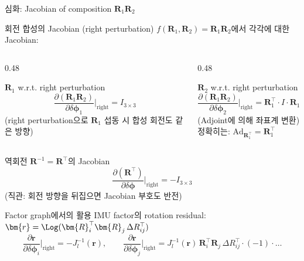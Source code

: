 \begin{frame}[shrink=5]{심화: Jacobian of composition $\bm{R}_1\bm{R}_2$}
  \begin{block}{회전 합성의 Jacobian (right perturbation)}
    $f(\bm{R}_1, \bm{R}_2) = \bm{R}_1\bm{R}_2$에서 각각에 대한 Jacobian:
  \end{block}
  \begin{columns}[T]
    \begin{column}{0.48\textwidth}
      \begin{alertblock}{$\bm{R}_1$ w.r.t. right perturbation}
        \[
          \frac{\partial(\bm{R}_1\bm{R}_2)}{\partial\delta\bm{\phi}_1}\bigg|_{\text{right}}
          = I_{3\times 3}
        \]
        (right perturbation으로 $\bm{R}_1$ 섭동 시 합성 회전도 같은 방향)
      \end{alertblock}
    \end{column}
    \begin{column}{0.48\textwidth}
      \begin{alertblock}{$\bm{R}_2$ w.r.t. right perturbation}
        \[
          \frac{\partial(\bm{R}_1\bm{R}_2)}{\partial\delta\bm{\phi}_2}\bigg|_{\text{right}}
          = \bm{R}_1^\top \cdot I \cdot \bm{R}_1 = I
        \]
        (Adjoint에 의해 좌표계 변환)\\
        \medskip
        정확히는: $\text{Ad}_{\bm{R}_1^\top} = \bm{R}_1^\top$
      \end{alertblock}
    \end{column}
  \end{columns}
  \pause
  \vspace{0.4em}
  \begin{block}{역회전 $\bm{R}^{-1} = \bm{R}^\top$의 Jacobian}
    \[
      \frac{\partial(\bm{R}^\top)}{\partial\delta\bm{\phi}}\bigg|_{\text{right}} = -I_{3\times 3}
    \]
    (직관: 회전 방향을 뒤집으면 Jacobian 부호도 반전)
  \end{block}
  \pause
  \begin{exampleblock}{Factor graph에서의 활용}
    IMU factor의 rotation residual: $\bm{r} = \Log(\bm{R}_i^\top\bm{R}_j\,\Delta R_{ij}^\top)$\\
    \[
      \frac{\partial\bm{r}}{\partial\delta\bm{\phi}_i}\bigg|_{\text{right}} = -J_l^{-1}(\bm{r}),
      \qquad
      \frac{\partial\bm{r}}{\partial\delta\bm{\phi}_j}\bigg|_{\text{right}} = J_l^{-1}(\bm{r})\,\bm{R}_i^\top\bm{R}_j\,\Delta R_{ij}^\top\cdot(-1)\cdot\ldots
    \]
  \end{exampleblock}
\end{frame}


